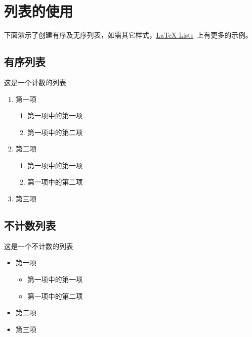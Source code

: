 \section{列表的使用}
下面演示了创建有序及无序列表，如需其它样式，\href{https://www.latex-tutorial.com/tutorials/lists/}{LaTeX Lists}~上有更多的示例。

\subsection{有序列表}
这是一个计数的列表
  \begin{enumerate}
      \item 第一项
          \begin{enumerate}
              \item 第一项中的第一项
              \item 第一项中的第二项
          \end{enumerate}
      \item 第二项
    \begin{enumerate}[label=(\roman*)]
      \item 第一项中的第一项
      \item 第一项中的第二项
    \end{enumerate}
      \item 第三项
  \end{enumerate}

\subsection{不计数列表}
  这是一个不计数的列表
  \begin{itemize}
      \item 第一项
      \begin{itemize}
          \item 第一项中的第一项
          \item 第一项中的第二项
      \end{itemize}
      \item 第二项
      \item 第三项
  \end{itemize}